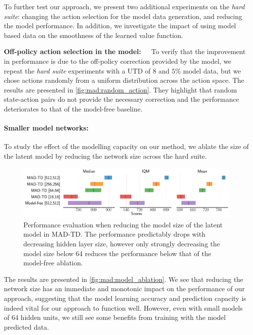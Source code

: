 To further test our approach, we present two additional experiments on the \emph{hard suite}: changing the action selection for the model data generation, and reducing the model performance.
In addition, we investigate the impact of using model based data on the smoothness of the learned value function.

\textbf{Off-policy action selection in the model:}~~~To verify that the  improvement in performance is due to the off-policy correction provided by the model, we repeat the \emph{hard suite} experiments with a UTD of $8$ and $5\%$ model data, but we chose actions randomly from a uniform distribution across the action space.
The results are presented in \autoref{fig:mad:random_action}.
They highlight that random state-action pairs do not provide the necessary correction and the performance deteriorates to that of the model-free baseline.

\paragraph{Smaller model networks:}To study the effect of the modelling capacity on our method, we ablate the size of the latent model by reducing the network size across the hard suite.
\begin{figure}[b]
    \centering
    \includegraphics[width=1.0\linewidth]{figures/mad-td/model_ablation_rliable.pdf}
    \caption{Performance evaluation when reducing the model size of the latent model in MAD-TD. The performance predictably drops with decreasing hidden layer size, however only strongly decreasing the model size below 64 reduces the performance below that of the model-free ablation.}
    \label{fig:mad:model_ablation}
\end{figure}
The results are presented in \autoref{fig:mad:model_ablation}.
We see that reducing the network size has an immediate and monotonic impact on the performance of our approach, suggesting that the model learning accuracy and prediction capacity is indeed vital for our approach to function well.
However, even with small models of 64 hidden units, we still see some benefits from training with the model predicted data.

